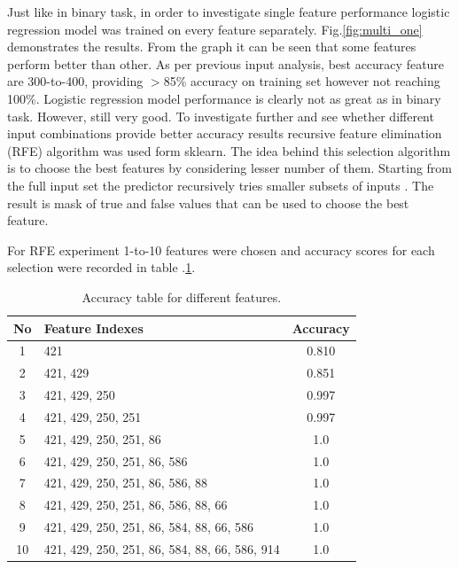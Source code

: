 \documentclass[11pt]{article}
\begin{document}
			Just like in binary task, in order to investigate single feature performance logistic regression model was trained on every feature separately. Fig.\ref{fig:multi_one} demonstrates the results. From the graph it can be seen that some features perform better than other. As per previous input analysis, best accuracy feature are 300-to-400, providing $>$85\% accuracy on training set however not reaching 100\%. Logistic regression model performance is clearly not as great as in binary task. However, still very good. To investigate further and see whether different input combinations provide better accuracy results recursive feature elimination (RFE) algorithm was used form sklearn. The idea behind this selection algorithm is to choose the best features by considering lesser number of them. Starting from the full input set the predictor recursively tries smaller subsets of inputs \cite{rfe}. The result is mask of true and false values that can be used to choose the best feature. 

			For RFE experiment 1-to-10 features were chosen and accuracy scores for each selection were recorded in table .\ref{tbl:accuracy_table}.

		\begin{center}
		  	\begin{table}[h]
		  	\centering
			\begin{tabular}[b]{|c | l | c|}
				 \hline
				 No & Feature Indexes 	  						    & Accuracy \\ 
				 \hline
				 1 & 421 											& 0.810 \\ 
				 2 & 421, 429 										& 0.851 \\ 
				 3 & 421, 429, 250 									& 0.997 \\ 
				 4 & 421, 429, 250, 251 							& 0.997 \\ 
				 5 & 421, 429, 250, 251, 86 						& 1.0 	\\ 
				 6 & 421, 429, 250, 251, 86, 586 					& 1.0 	\\ 
				 7 & 421, 429, 250, 251, 86, 586, 88 				& 1.0 	\\ 
				 8 & 421, 429, 250, 251, 86, 586, 88, 66 			& 1.0 	\\ 
				 9 & 421, 429, 250, 251, 86, 584, 88, 66, 586 		& 1.0 	\\ 
				 10 & 421, 429, 250, 251, 86, 584, 88, 66, 586, 914 & 1.0 	\\ 
				 \hline
			\end{tabular}
			\caption{Accuracy table for different features. }
			\label{tbl:accuracy_table}
			\end{table}
		\end{center}
		\vspace*{-1.5cm}
\end{document}
